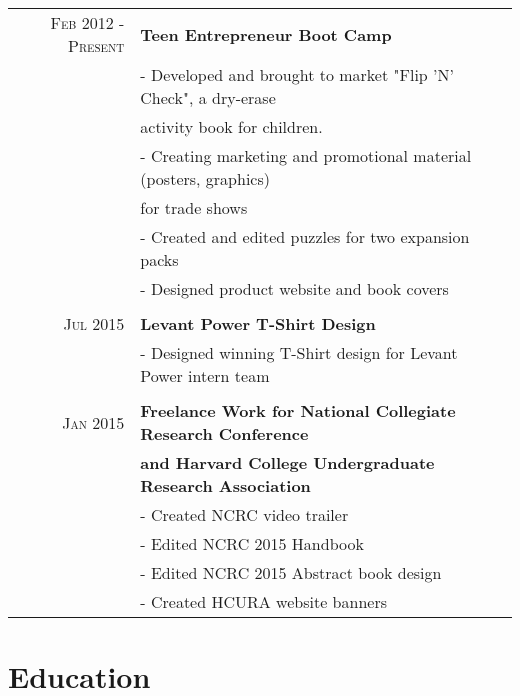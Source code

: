 \documentclass[letterpaper,10pt]{article} %
\begin{document}
\begin{tabular}{r|p{11cm}}
\textsc{Feb 2012 - Present} & \textbf{Teen Entrepreneur Boot Camp} \\ 
& - Developed and brought to market "Flip 'N' Check", a dry-erase \\
& activity book for children. \\
& - Creating marketing and promotional material (posters, graphics) \\
& for trade shows \\
& - Created and edited puzzles for two expansion packs \\
& - Designed product website and book covers \\

\\
\textsc{Jul 2015} & \textbf{Levant Power T-Shirt Design} \\
& - Designed winning T-Shirt design for Levant Power intern team \\

\\
\textsc{Jan 2015} & \textbf{Freelance Work for National Collegiate Research Conference} \\
& \textbf{and Harvard College Undergraduate Research Association} \\
& - Created NCRC video trailer \\
& - Edited NCRC 2015 Handbook \\
& - Edited NCRC 2015 Abstract book design \\
& - Created HCURA website banners \\
\end{tabular}


\section{Education}
\end{document}
